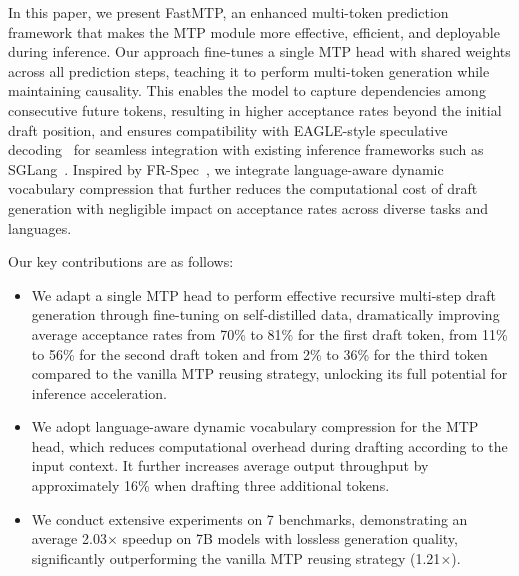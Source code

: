 \documentclass{article} %
\begin{document}
In this paper, we present FastMTP, an enhanced multi-token prediction framework that makes the MTP module more effective, efficient, and deployable during inference. Our approach fine-tunes a single MTP head with shared weights across all prediction steps, teaching it to perform multi-token generation while maintaining causality. This enables the model to capture dependencies among consecutive future tokens, resulting in higher acceptance rates beyond the initial draft position, and ensures compatibility with EAGLE-style speculative decoding~\citep{li2024eagle} for seamless integration with existing inference frameworks such as SGLang~\citep{zheng2024sglang}. Inspired by FR-Spec~\citep{zhao2025frspec}, we integrate language-aware dynamic vocabulary compression that further reduces the computational cost of draft generation with negligible impact on acceptance rates across diverse tasks and languages.

Our key contributions are as follows:
\begin{itemize}
    \item We adapt a single MTP head to perform effective recursive multi-step draft generation through fine-tuning on self-distilled data, dramatically improving average acceptance rates from 70\% to 81\% for the first draft token, from 11\% to 56\% for the second draft token and from 2\% to 36\% for the third token compared to the vanilla MTP reusing strategy, unlocking its full potential for inference acceleration.

    \item We adopt language-aware dynamic vocabulary compression for the MTP head, which reduces computational overhead during drafting according to the input context. It further increases average output throughput by approximately 16\% when drafting three additional tokens.
    
    \item We conduct extensive experiments on 7 benchmarks, demonstrating an average 2.03$\times$ speedup on 7B models with lossless generation quality, significantly outperforming the vanilla MTP reusing strategy (1.21$\times$).
    
    
\end{itemize}
\end{document}

